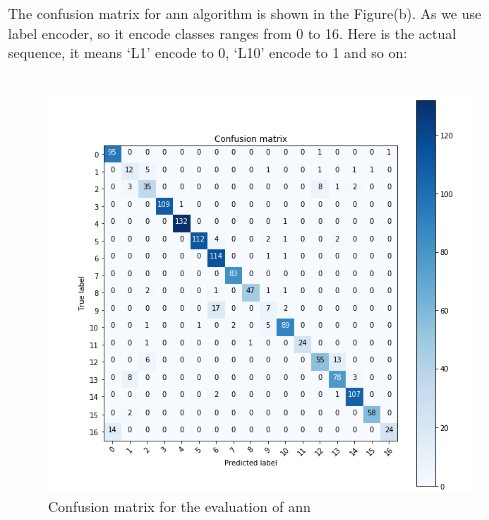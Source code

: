 The confusion matrix for ann algorithm is shown in the Figure(b). As we use label encoder, so it encode classes ranges from 0 to 16. Here is the actual sequence, it means ‘L1’ encode to 0, ‘L10’ encode to 1 and so on:
\\\\
\begin{figure}[h]

  		\centering
    		\includegraphics[scale=0.7]{./Figures/cmann}
\caption{Confusion matrix for the evaluation of ann}
\label{fig:7}
 		\end{figure}


